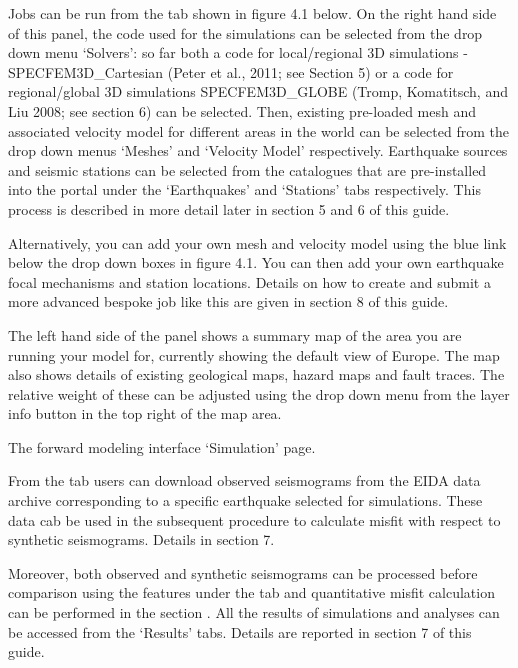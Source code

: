 \documentclass[english]{book}
\begin{document}
Jobs can be run from the  tab shown in figure 4.1 below.
On the right hand side of this panel, the code used for the simulations
can be selected from the drop down menu ‘Solvers’: so far both a code
for local/regional 3D simulations - SPECFEM3D\_Cartesian (Peter et al.,
2011; see Section 5) \textendash{} or a code for regional/global 3D simulations \textendash{}
SPECFEM3D\_GLOBE (Tromp, Komatitsch, and Liu 2008; see section 6) \textendash{} can
be selected. Then, existing pre-loaded mesh and associated velocity
model for different areas in the world can be selected from the drop
down menus ‘Meshes’ and ‘Velocity Model’ respectively. Earthquake
sources and seismic stations can be selected from the catalogues that
are pre-installed into the portal under the ‘Earthquakes’ and ‘Stations’
tabs respectively. This process is described in more detail later in
section 5 and 6 of this guide.

Alternatively, you can add your own mesh and velocity model using the
blue link below the drop down boxes in figure 4.1. You can then add your
own earthquake focal mechanisms and station locations. Details on how to
create and submit a more advanced bespoke job like this are given in
section 8 of this guide.

The left hand side of the panel shows a summary map of the area you are
running your model for, currently showing the default view of Europe.
The map also shows details of existing geological maps, hazard maps and
fault traces. The relative weight of these can be adjusted using the
drop down menu from the layer info button in the top right of the map
area.


 The forward modeling interface ‘Simulation’ page.

From the  tab users can download observed seismograms from
the EIDA data archive corresponding to a specific earthquake selected
for simulations. These data cab be used in the subsequent procedure to
calculate misfit with respect to synthetic seismograms. Details in
section 7.

Moreover, both observed and synthetic seismograms can be processed
before comparison using the features under the  tab and
quantitative misfit calculation can be performed in the section
. All the results of simulations and analyses can be accessed
from the ‘Results’ tabs. Details are reported in section 7 of this
guide.
\end{document}
